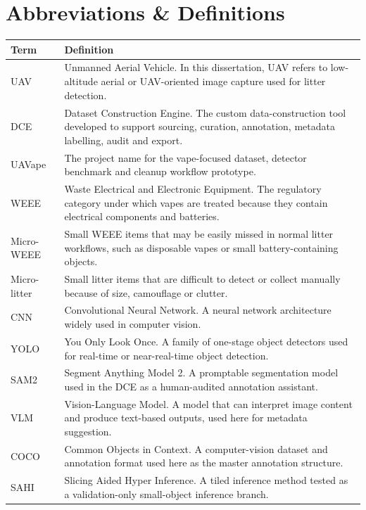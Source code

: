\section{Abbreviations \& Definitions}

\begin{table}[H]
\centering
\small
\begin{tabularx}{\textwidth}{p{} X}
\toprule
\textbf{Term} & \textbf{Definition} \\
\midrule
UAV & Unmanned Aerial Vehicle. In this dissertation, UAV refers to low-altitude aerial or UAV-oriented image capture used for litter detection. \\
DCE & Dataset Construction Engine. The custom data-construction tool developed to support sourcing, curation, annotation, metadata labelling, audit and export. \\
UAVape & The project name for the vape-focused dataset, detector benchmark and cleanup workflow prototype. \\
WEEE & Waste Electrical and Electronic Equipment. The regulatory category under which vapes are treated because they contain electrical components and batteries. \\
Micro-WEEE & Small WEEE items that may be easily missed in normal litter workflows, such as disposable vapes or small battery-containing objects. \\
Micro-litter & Small litter items that are difficult to detect or collect manually because of size, camouflage or clutter. \\
CNN & Convolutional Neural Network. A neural network architecture widely used in computer vision. \\
YOLO & You Only Look Once. A family of one-stage object detectors used for real-time or near-real-time object detection. \\
SAM2 & Segment Anything Model 2. A promptable segmentation model used in the DCE as a human-audited annotation assistant. \\
VLM & Vision-Language Model. A model that can interpret image content and produce text-based outputs, used here for metadata suggestion. \\
COCO & Common Objects in Context. A computer-vision dataset and annotation format used here as the master annotation structure. \\
SAHI & Slicing Aided Hyper Inference. A tiled inference method tested as a validation-only small-object inference branch. \\

\end{tabularx}
\end{table}
